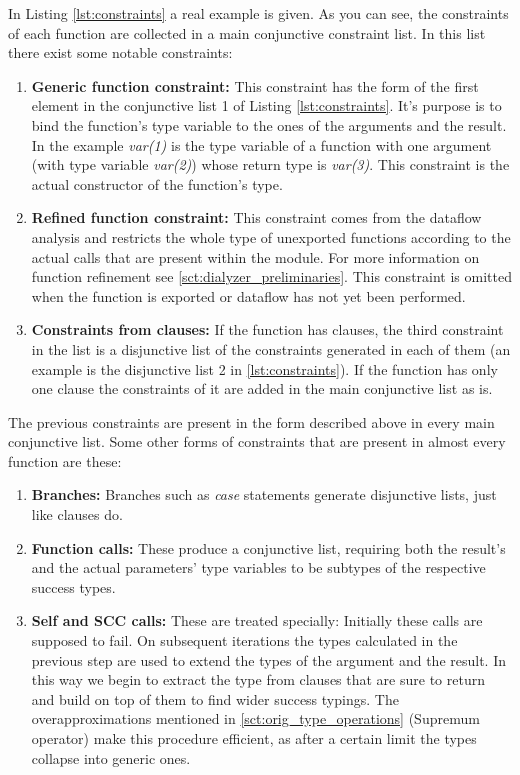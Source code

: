 In Listing \ref{lst:constraints} a real example is given. As you can
see, the constraints of each function are collected in a main
conjunctive constraint list. In this list there exist some notable
constraints:

\begin{enumerate}
  \item \textbf{Generic function constraint:} This constraint has the
    form of the first element in the conjunctive list 1 of Listing
    \ref{lst:constraints}. It's purpose is to bind the function's type
    variable to the ones of the arguments and the result. In the
    example \emph{var(1)} is the type variable of a function with one
    argument (with type variable \emph{var(2)}) whose return type is
    \emph{var(3)}. This constraint is the actual constructor of the
    function's type.
  \item \textbf{Refined function constraint:} This constraint comes
    from the dataflow analysis and restricts the whole type of
    unexported functions according to the actual calls that are
    present within the module. For more information on function
    refinement see \ref{sct:dialyzer_preliminaries}. This constraint
    is omitted when the function is exported or dataflow has not yet
    been performed.
  \item \textbf{Constraints from clauses:} If the function has
    clauses, the third constraint in the list is a disjunctive list of
    the constraints generated in each of them (an example is the
    disjunctive list 2 in \ref{lst:constraints}). If the function has
    only one clause the constraints of it are added in the main
    conjunctive list as is.
\end{enumerate}

The previous constraints are present in the form described above in
every main conjunctive list. Some other forms of constraints that are
present in almost every function are these:

\begin{enumerate}
  \item \textbf{Branches:} Branches such as \emph{case} statements
    generate disjunctive lists, just like clauses do.
  \item \textbf{Function calls:} These produce a conjunctive list,
    requiring both the result's and the actual parameters' type
    variables to be subtypes of the respective success types.
  \item \textbf{Self and SCC calls:} These are treated specially:
    Initially these calls are supposed to fail. On subsequent
    iterations the types calculated in the previous step are used to
    extend the types of the argument and the result. In this way we
    begin to extract the type from clauses that are sure to return and
    build on top of them to find wider success typings. The
    overapproximations mentioned in \ref{sct:orig_type_operations}
    (Supremum operator) make this procedure efficient, as after a
    certain limit the types collapse into generic ones.
\end{enumerate}

